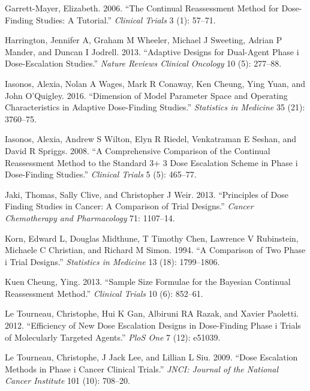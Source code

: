 \documentclass[
]{article}
\newlength{\cslhangindent}
\newlength{\cslentryspacingunit} %
\newenvironment{CSLReferences}[2] %
 {%
  \setlength{\parindent}{0pt}
  \ifodd #1
  \let\oldpar\par
  \def\par{\hangindent=\cslhangindent\oldpar}
  \fi
  \setlength{\parskip}{#2\cslentryspacingunit}
 }%
 {}
\begin{document}
\begin{CSLReferences}{1}{0}
\leavevmode{}%
Garrett-Mayer, Elizabeth. 2006. {``The Continual Reassessment Method for
Dose-Finding Studies: A Tutorial.''} \emph{Clinical Trials} 3 (1):
57--71.

\leavevmode{}%
Harrington, Jennifer A, Graham M Wheeler, Michael J Sweeting, Adrian P
Mander, and Duncan I Jodrell. 2013. {``Adaptive Designs for Dual-Agent
Phase i Dose-Escalation Studies.''} \emph{Nature Reviews Clinical
Oncology} 10 (5): 277--88.

\leavevmode{}%
Iasonos, Alexia, Nolan A Wages, Mark R Conaway, Ken Cheung, Ying Yuan,
and John O'Quigley. 2016. {``Dimension of Model Parameter Space and
Operating Characteristics in Adaptive Dose-Finding Studies.''}
\emph{Statistics in Medicine} 35 (21): 3760--75.

\leavevmode{}%
Iasonos, Alexia, Andrew S Wilton, Elyn R Riedel, Venkatraman E Seshan,
and David R Spriggs. 2008. {``A Comprehensive Comparison of the
Continual Reassessment Method to the Standard 3+ 3 Dose Escalation
Scheme in Phase i Dose-Finding Studies.''} \emph{Clinical Trials} 5 (5):
465--77.

\leavevmode{}%
Jaki, Thomas, Sally Clive, and Christopher J Weir. 2013. {``Principles
of Dose Finding Studies in Cancer: A Comparison of Trial Designs.''}
\emph{Cancer Chemotherapy and Pharmacology} 71: 1107--14.

\leavevmode{}%
Korn, Edward L, Douglas Midthune, T Timothy Chen, Lawrence V Rubinstein,
Michaele C Christian, and Richard M Simon. 1994. {``A Comparison of Two
Phase i Trial Designs.''} \emph{Statistics in Medicine} 13 (18):
1799--1806.

\leavevmode{}%
Kuen Cheung, Ying. 2013. {``Sample Size Formulae for the Bayesian
Continual Reassessment Method.''} \emph{Clinical Trials} 10 (6):
852--61.

\leavevmode{}%
Le Tourneau, Christophe, Hui K Gan, Albiruni RA Razak, and Xavier
Paoletti. 2012. {``Efficiency of New Dose Escalation Designs in
Dose-Finding Phase i Trials of Molecularly Targeted Agents.''}
\emph{PloS One} 7 (12): e51039.

\leavevmode{}%
Le Tourneau, Christophe, J Jack Lee, and Lillian L Siu. 2009. {``Dose
Escalation Methods in Phase i Cancer Clinical Trials.''} \emph{JNCI:
Journal of the National Cancer Institute} 101 (10): 708--20.


\end{CSLReferences}
\end{document}
